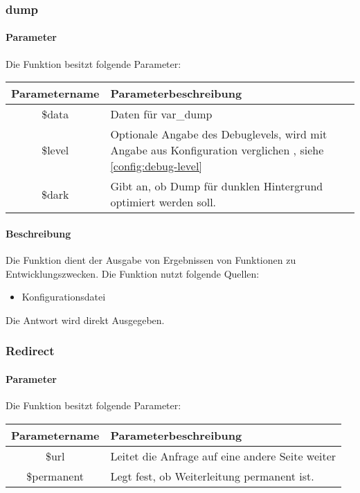 \subsubsection{dump}
\paragraph{Parameter} Die Funktion besitzt folgende Parameter:
\begin{table}[H]
	\begin{tabular}{|c|p{11cm}|}
		\hline
		\textbf{Parametername} & \textbf{Parameterbeschreibung} \\ \hline
		\$data  & Daten für var\_dump \\ \hline
		\$level & Optionale Angabe des Debuglevels, wird mit Angabe aus Konfiguration verglichen , siehe \autoref{config:debug-level} \\ \hline
		\$dark  & Gibt an, ob Dump für dunklen Hintergrund optimiert werden soll. \\ \hline
	\end{tabular}
\end{table}
\paragraph{Beschreibung} Die Funktion dient der Ausgabe von Ergebnissen von Funktionen zu Entwicklungszwecken. Die Funktion nutzt folgende Quellen:
\begin{itemize}
	\item Konfigurationsdatei
\end{itemize}
Die Antwort wird direkt Ausgegeben.
\subsubsection{Redirect}
\paragraph{Parameter} Die Funktion besitzt folgende Parameter:
\begin{table}[H]
	\begin{tabular}{|c|p{11cm}|}
		\hline
		\textbf{Parametername} & \textbf{Parameterbeschreibung} \\ \hline
		\$url       & Leitet die Anfrage auf eine andere Seite weiter \\ \hline
		\$permanent & Legt fest, ob Weiterleitung permanent ist. \\ \hline
	\end{tabular}
\end{table}
